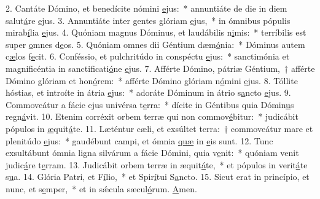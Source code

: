 2. Cantáte Dómino, et benedícite nómini \uline{e}jus:~* annuntiáte de die in diem salut\uline{á}re \uline{e}jus.
3. Annuntiáte inter gentes glóriam \uline{e}jus,~* in ómnibus pópulis mirab\uline{í}lia \uline{e}jus.
4. Quóniam magnus Dóminus, et laudábilis n\uline{i}mis:~* terríbilis est super \uline{o}mnes d\uline{e}os.
5. Quóniam omnes dii Géntium dæm\uline{ó}nia:~* Dóminus autem c\uline{æ}los f\uline{e}cit.
6. Conféssio, et pulchritúdo in conspéctu \uline{e}jus:~* sanctimónia et magnificéntia in sanctificati\uline{ó}ne \uline{e}jus.
7. Afférte Dómino, pátriæ Géntium,~† afférte Dómino glóriam et hon\uline{ó}rem:~* afférte Dómino glóriam n\uline{ó}mini \uline{e}jus.
8. Tóllite hóstias, et introíte in átria \uline{e}jus:~* adoráte Dóminum in átrio s\uline{a}ncto \uline{e}jus.
9. Commoveátur a fácie ejus univérsa t\uline{e}rra:~* dícite in Géntibus quia Dómin\uline{u}s regn\uline{á}vit.
10. Etenim corréxit orbem terræ qui non commov\uline{é}bitur:~* judicábit pópulos in \uline{æ}quit\uline{á}te.
11. Læténtur cæli, et exsúltet terra:~† commoveátur mare et plenitúdo \uline{e}jus:~* gaudébunt campi, et ómnia \uline{quæ} in \uline{e}is sunt.
12. Tunc exsultábunt ómnia ligna silvárum a fácie Dómini, quia v\uline{e}nit:~* quóniam venit judic\uline{á}re t\uline{e}rram.
13. Judicábit orbem terræ in æquit\uline{á}te,~* et pópulos in verit\uline{á}te s\uline{u}a.
14. Glória Patri, et F\uline{í}lio,~* et Spir\uline{í}tui S\uline{a}ncto.
15. Sicut erat in princípio, et nunc, et s\uline{e}mper,~* et in sǽcula sæcul\uline{ó}rum. \uline{A}men.
